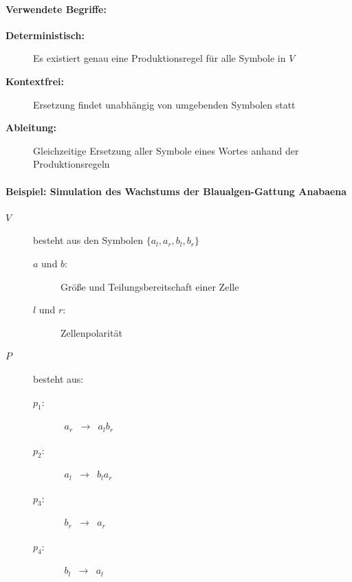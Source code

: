 \paragraph{Verwendete Begriffe:\\}

\begin{description}
	\item[\textbf{Deterministisch:}] Es existiert genau eine Produktionsregel für alle Symbole in $V$ \\
	
	\item[\textbf{Kontextfrei:}] Ersetzung findet unabhängig von umgebenden Symbolen statt \\
	
	\item[\textbf{Ableitung:}] Gleichzeitige Ersetzung aller Symbole eines Wortes anhand der Produktionsregeln
	
\end{description}

\newpage
{}

\paragraph{Beispiel: Simulation des Wachstums der Blaualgen-Gattung \glqq Anabaena\grqq{} \\}

  
\begin{description}
	\item[\boldmath$V$]  besteht aus den Symbolen \boldmath$\{a_l, a_r, b_l, b_r\}$
	\begin{description}
		\item[\boldmath$a$ und \boldmath$b$:] Größe und Teilungsbereitschaft einer Zelle\\
		\item[\boldmath$l$ und \boldmath$r$:] Zellenpolarität
	\end{description}
	\item[\boldmath$P$] besteht aus:
	\begin{description}
		\item[\boldmath$p_1 :$] $\begin{array}{ccc} a_r & \rightarrow & a_lb_r \end{array}$
		\item[\boldmath$p_2 :$] $\begin{array}{ccc} a_l &\rightarrow& b_la_r \end{array}$
		\item[\boldmath$p_3 :$] $\begin{array}{ccc} b_r &\rightarrow& a_r \end{array}$
		\item[\boldmath$p_4 :$] $\begin{array}{ccc} b_l &\rightarrow& a_l  \end{array}$
	\end{description}
\end{description}

